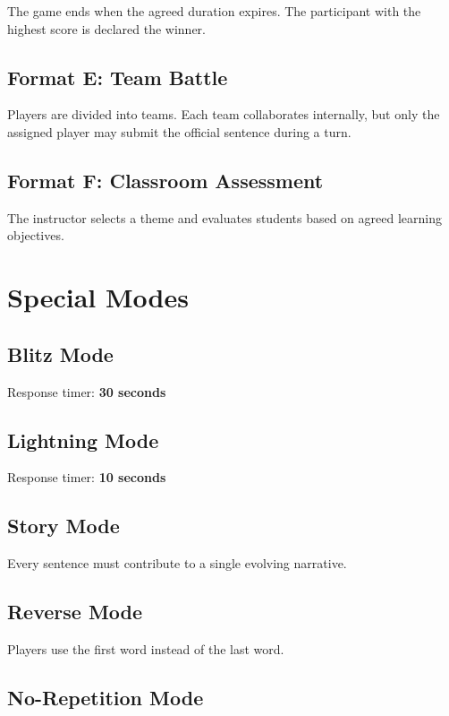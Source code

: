 \documentclass[11pt,a4paper]{article}
\begin{document}
The game ends when the agreed duration expires. The participant with the highest score is declared the winner.

\subsection{Format E: Team Battle}

Players are divided into teams. Each team collaborates internally, but only the assigned player may submit the official sentence during a turn.

\subsection{Format F: Classroom Assessment}

The instructor selects a theme and evaluates students based on agreed learning objectives.

\section{Special Modes}

\subsection{Blitz Mode}

Response timer: \textbf{30 seconds}

\subsection{Lightning Mode}

Response timer: \textbf{10 seconds}

\subsection{Story Mode}

Every sentence must contribute to a single evolving narrative.

\subsection{Reverse Mode}

Players use the first word instead of the last word.

\subsection{No-Repetition Mode}
\end{document}
